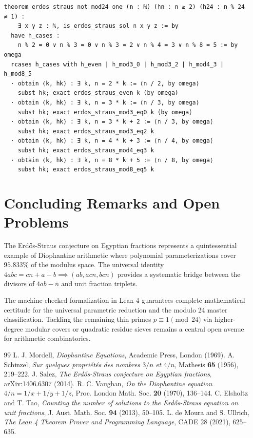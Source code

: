 \documentclass[11pt,a4paper]{article}
\theoremstyle{definition}
\begin{document}
\begin{lstlisting}[caption={Certified Lean 4 Formalization of Erd\H{o}s-Straus Parameterizations}]
theorem erdos_straus_not_mod24_one (n : ℕ) (hn : n ≥ 2) (h24 : n % 24 ≠ 1) :
    ∃ x y z : ℕ, is_erdos_straus_sol n x y z := by
  have h_cases :
    n % 2 = 0 ∨ n % 3 = 0 ∨ n % 3 = 2 ∨ n % 4 = 3 ∨ n % 8 = 5 := by omega
  rcases h_cases with h_even | h_mod3_0 | h_mod3_2 | h_mod4_3 | h_mod8_5
  · obtain ⟨k, hk⟩ : ∃ k, n = 2 * k := ⟨n / 2, by omega⟩
    subst hk; exact erdos_straus_even k (by omega)
  · obtain ⟨k, hk⟩ : ∃ k, n = 3 * k := ⟨n / 3, by omega⟩
    subst hk; exact erdos_straus_mod3_eq0 k (by omega)
  · obtain ⟨k, hk⟩ : ∃ k, n = 3 * k + 2 := ⟨n / 3, by omega⟩
    subst hk; exact erdos_straus_mod3_eq2 k
  · obtain ⟨k, hk⟩ : ∃ k, n = 4 * k + 3 := ⟨n / 4, by omega⟩
    subst hk; exact erdos_straus_mod4_eq3 k
  · obtain ⟨k, hk⟩ : ∃ k, n = 8 * k + 5 := ⟨n / 8, by omega⟩
    subst hk; exact erdos_straus_mod8_eq5 k
\end{lstlisting}

\section{Concluding Remarks and Open Problems}

The Erd\H{o}s-Straus conjecture on Egyptian fractions represents a quintessential example of Diophantine arithmetic where polynomial parameterizations cover $95.833\%$ of the modulus space. The universal identity $4abc = cn + a + b \implies (ab, acn, bcn)$ provides a systematic bridge between the divisors of $4ab - n$ and unit fraction triplets.

The machine-checked formalization in Lean 4 guarantees complete mathematical certitude for the universal parametric reduction and the modulo 24 master classification. Tackling the remaining thin primes $p \equiv 1 \pmod{24}$ via higher-degree modular covers or quadratic residue sieves remains a central open avenue for arithmetic combinatorics.

\begin{thebibliography}{99}
 L. J. Mordell, \textit{Diophantine Equations}, Academic Press, London (1969).
 A. Schinzel, \textit{Sur quelques propri\'et\'es des nombres $3/n$ et $4/n$}, Mathesis \textbf{65} (1956), 219--222.
 J. Salez, \textit{The Erd\H{o}s-Straus conjecture on Egyptian fractions}, arXiv:1406.6307 (2014).
 R. C. Vaughan, \textit{On the Diophantine equation $4/n = 1/x + 1/y + 1/z$}, Proc. London Math. Soc. \textbf{20} (1970), 136--144.
 C. Elsholtz and T. Tao, \textit{Counting the number of solutions to the Erd\H{o}s-Straus equation on unit fractions}, J. Aust. Math. Soc. \textbf{94} (2013), 50--105.
 L. de Moura and S. Ullrich, \textit{The Lean 4 Theorem Prover and Programming Language}, CADE 28 (2021), 625--635.
\end{thebibliography}
\end{document}
